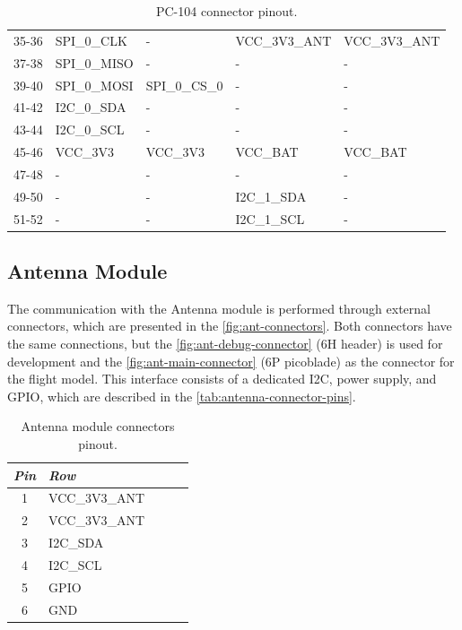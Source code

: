 \begin{table}[!h]
\begin{tabular}{cllll}
        35-36              & SPI\_0\_CLK      & -                & VCC\_3V3\_ANT & VCC\_3V3\_ANT \\
        37-38              & SPI\_0\_MISO     & -                & -             & -             \\
        39-40              & SPI\_0\_MOSI     & SPI\_0\_CS\_0    & -             & -             \\
        41-42              & I2C\_0\_SDA      & -                & -             & -             \\
        43-44              & I2C\_0\_SCL      & -                & -             & -             \\
        45-46              & VCC\_3V3         & VCC\_3V3         & VCC\_BAT      & VCC\_BAT      \\
        47-48              & -                & -                & -             & -             \\
        49-50              & -                & -                & I2C\_1\_SDA   & -             \\
        51-52              & -                & -                & I2C\_1\_SCL   & -             \\
        \bottomrule[1.5pt]
    \end{tabular}
    \caption{PC-104 connector pinout.}
    \label{tab:pc104-pins}
\end{table}

\subsection{Antenna Module}

The communication with the Antenna module is performed through external connectors, which are presented in the \autoref{fig:ant-connectors}. Both connectors have the same connections, but the \ref{fig:ant-debug-connector} (6H header) is used for development and the \ref{fig:ant-main-connector} (6P picoblade) as the connector for the flight model. This interface consists of a dedicated I2C, power supply, and GPIO, which are described in the \autoref{tab:antenna-connector-pins}.

\begin{table}[!h]
    \centering
    \begin{tabular}{cllll}
        \toprule[1.5pt]
        \textit{Pin} & \textit{Row} \\
        \midrule
        1            & VCC\_3V3\_ANT  \\
        2            & VCC\_3V3\_ANT  \\
        3            & I2C\_SDA       \\
        4            & I2C\_SCL       \\
        5            & GPIO           \\
        6            & GND            \\
        \bottomrule[1.5pt]
    \end{tabular}
    \caption{Antenna module connectors pinout.}
    \label{tab:antenna-connector-pins}
\end{table}

